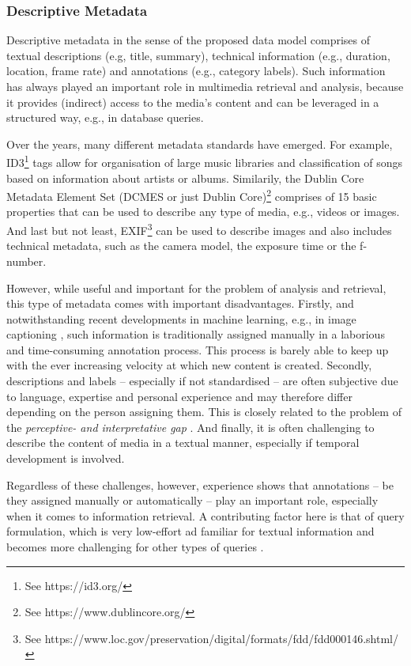 \subsubsection{Descriptive Metadata}
Descriptive metadata in the sense of the proposed data model comprises of textual descriptions (e.g, title, summary), technical information (e.g., duration, location, frame rate) and annotations (e.g., category labels). Such information has always played an important role in multimedia retrieval and analysis, because it provides (indirect) access to the media's content and can be leveraged in a structured way, e.g., in database queries. 

Over the years, many different metadata standards have emerged. For example, ID3\footnote{See https://id3.org/} tags allow for organisation of large music libraries and classification of songs based on information about artists or albums. Similarily, the Dublin Core Metadata Element Set (DCMES or just Dublin Core)\footnote{See https://www.dublincore.org/} comprises of 15 basic properties that can be used to describe any type of media, e.g., videos or images. And last but not least, EXIF\footnote{See https://www.loc.gov/preservation/digital/formats/fdd/fdd000146.shtml/} can be used to describe images and also includes technical metadata, such as the camera model, the exposure time or the f-number.

However, while useful and important for the problem of analysis and retrieval, this type of metadata comes with important disadvantages. Firstly, and notwithstanding recent developments in machine learning, e.g., in image captioning \cite{Hossain:2019Comprehensive}, such information is traditionally assigned manually in a laborious and time-consuming annotation process. This process is barely able to keep up with the ever increasing velocity at which new content is created. Secondly, descriptions and labels -- especially if not standardised -- are often subjective due to language, expertise and personal experience and may therefore differ depending on the person assigning them. This is closely related to the problem of the \emph{perceptive- and interpretative gap} \cite{Rossetto:2018thesis}. And finally, it is often challenging to describe the content of media in a textual manner, especially if temporal development is involved.

Regardless of these challenges, however, experience shows that annotations -- be they assigned manually or automatically -- play an important role, especially when it comes to information retrieval. A contributing factor here is that of query formulation, which is very low-effort ad familiar for textual information and becomes more challenging for other types of queries .

